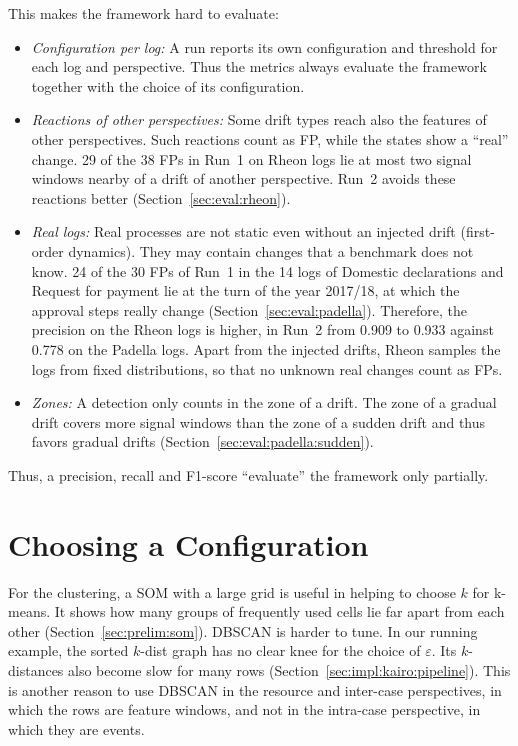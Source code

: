 This makes the framework hard to evaluate:
\begin{itemize}
	\item \emph{Configuration per log:} A run reports its own configuration and threshold for each log and perspective. Thus the metrics always evaluate the framework together with the choice of its configuration.
	\item \emph{Reactions of other perspectives:} Some drift types reach also the features of other perspectives. Such reactions count as FP, while the states show a \enquote{real} change. 29 of the 38 FPs in Run~1 on Rheon logs lie at most two signal windows nearby of a drift of another perspective. Run~2 avoids these reactions better (Section~\ref{sec:eval:rheon}).
	\item \emph{Real logs:} Real processes are not static even without an injected drift (first-order dynamics). They may contain changes that a benchmark does not know. 24 of the 30 FPs of Run~1 in the 14 logs of Domestic declarations and Request for payment lie at the turn of the year 2017/18, at which the approval steps really change (Section~\ref{sec:eval:padella}). Therefore, the precision on the Rheon logs is higher, in Run~2 from 0.909 to 0.933 against 0.778 on the Padella logs. Apart from the injected drifts, Rheon samples the logs from fixed distributions, so that no unknown real changes count as FPs.
	\item \emph{Zones:} A detection only counts in the zone of a drift. The zone of a gradual drift covers more signal windows than the zone of a sudden drift and thus favors gradual drifts (Section~\ref{sec:eval:padella:sudden}).
\end{itemize}
Thus, a precision, recall and F1-score \enquote{evaluate} the framework only partially.

\section{Choosing a Configuration}
\label{sec:discussion:config}
For the clustering, a SOM with a large grid is useful in helping to choose $k$ for k-means. It shows how many groups of frequently used cells lie far apart from each other (Section~\ref{sec:prelim:som}). DBSCAN is harder to tune. In our running example, the sorted $k$-dist graph has no clear knee for the choice of $\varepsilon$. Its $k$-distances also become slow for many rows (Section~\ref{sec:impl:kairo:pipeline}). This is another reason to use DBSCAN in the resource and inter-case perspectives, in which the rows are feature windows, and not in the intra-case perspective, in which they are events.

